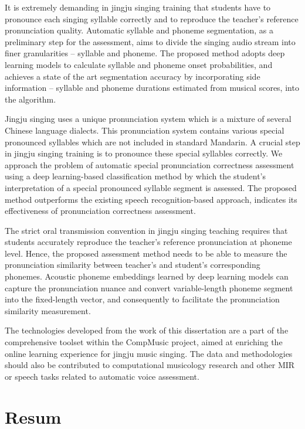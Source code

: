 It is extremely demanding in jingju singing training that students have to pronounce each singing syllable correctly and to reproduce the teacher's reference pronunciation quality. Automatic syllable and phoneme segmentation, as a preliminary step for the assessment, aims to divide the singing audio stream into finer granularities -- syllable and phoneme. The proposed method adopts deep learning models to calculate syllable and phoneme onset probabilities, and achieves a state of the art segmentation accuracy by incorporating side information -- syllable and phoneme durations estimated from musical scores, into the algorithm.

Jingju singing uses a unique pronunciation system which is a mixture of several Chinese language dialects. This pronunciation system contains various special pronounced syllables which are not included in standard Mandarin. A crucial step in jingju singing training is to pronounce these special syllables correctly. We approach the problem of automatic special pronunciation correctness assessment using a deep learning-based classification method by which the student's interpretation of a special pronounced syllable segment is assessed. The proposed method outperforms the existing speech recognition-based approach, indicates its effectiveness of pronunciation correctness assessment.

The strict oral transmission convention in jingju singing teaching requires that students accurately reproduce the teacher's reference pronunciation at phoneme level. Hence, the proposed assessment method needs to be able to measure the pronunciation similarity between teacher's and student's corresponding phonemes. Acoustic phoneme embeddings learned by deep learning models can capture the pronunciation nuance and convert variable-length phoneme segment into the fixed-length vector, and consequently to facilitate the pronunciation similarity measurement.

The technologies developed from the work of this dissertation are a part of the comprehensive toolset within the CompMusic project, aimed at enriching the online learning experience for jingju music singing. The data and methodologies should also be contributed to computational musicology research and other MIR or speech tasks related to automatic voice assessment.
\chapter{Resum}
\vspace*{-1cm}


